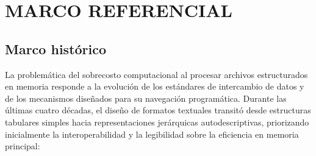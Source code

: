 \section{MARCO REFERENCIAL}

\subsection{Marco histórico}

La problemática del sobrecosto computacional al procesar archivos estructurados en memoria responde a la evolución de los estándares de intercambio de datos y de los mecanismos diseñados para su navegación programática. Durante las últimas cuatro décadas, el diseño de formatos textuales transitó desde estructuras tabulares simples hacia representaciones jerárquicas autodescriptivas, priorizando inicialmente la interoperabilidad y la legibilidad sobre la eficiencia en memoria principal:


